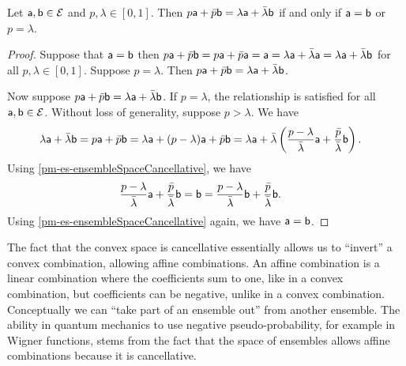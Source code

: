 \begin{mathSection}
\begin{coro}\label{pm-es-uniqueMixtureCoefficient}
	Let $\ens[a], \ens[b] \in \Ens$ and $p,\lambda \in [0,1]$. Then $p\ens[a] + \bar{p} \ens[b] = \lambda \ens[a] + \bar{\lambda} \ens[b]$ if and only if $\ens[a] = \ens[b]$ or $p=\lambda$.
\end{coro}

\begin{proof}
	Suppose that $\ens[a] = \ens[b]$ then $p\ens[a] + \bar{p} \ens[b] = p\ens[a] + \bar{p} \ens[a] = \ens[a] = \lambda \ens[a] + \bar{\lambda} \ens[a] = \lambda \ens[a] + \bar{\lambda} \ens[b]$ for all $p,\lambda \in [0,1]$. Suppose $p=\lambda$. Then $p\ens[a] + \bar{p} \ens[b] = \lambda \ens[a] + \bar{\lambda} \ens[b]$.
	
	Now suppose $p\ens[a] + \bar{p} \ens[b] = \lambda \ens[a] + \bar{\lambda} \ens[b]$. If $p=\lambda$, the relationship is satisfied for all $\ens[a],\ens[b] \in \Ens$. Without loss of generality, suppose $p > \lambda$. We have
	\begin{align}
		\lambda \ens[a] + \bar{\lambda} \ens[b] &= p \ens[a] + \bar{p} \ens[b] = \lambda \ens[a] + (p-\lambda) \ens[a] + \bar{p} \ens[b] = \lambda \ens[a] + \bar{\lambda}\left(\frac{p-\lambda}{\bar{\lambda}} \ens[a] + \frac{\bar{p}}{\bar{\lambda}} \ens[b] \right).
	\end{align}
	Using \ref{pm-es-ensembleSpaceCancellative}, we have
	\begin{align}
		\frac{p-\lambda}{\bar{\lambda}} \ens[a] + \frac{\bar{p}}{\bar{\lambda}} \ens[b] &= \ens[b] = \frac{p-\lambda}{\bar{\lambda}} \ens[b] + \frac{\bar{p}}{\bar{\lambda}} \ens[b].
	\end{align}
	Using \ref{pm-es-ensembleSpaceCancellative} again, we have $\ens[a] = \ens[b]$.
\end{proof}

\end{mathSection}

The fact that the convex space is cancellative essentially allows us to ``invert'' a convex combination, allowing affine combinations. An affine combination is a linear combination where the coefficients sum to one, like in a convex combination, but coefficients can be negative, unlike in a convex combination. Conceptually we can ``take part of an ensemble out'' from another ensemble. The ability in quantum mechanics to use negative pseudo-probability, for example in Wigner functions, stems from the fact that the space of ensembles allows affine combinations because it is cancellative.

